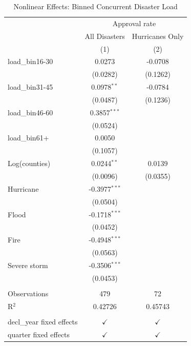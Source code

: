 
\begin{table}[htbp]
   \caption{\label{tab:binned} Nonlinear Effects: Binned Concurrent Disaster Load}
   \bigskip
   \centering
   \begin{tabular}{lcc}
      \toprule
       & \multicolumn{2}{c}{Approval rate}\\
                                & All Disasters   & Hurricanes Only \\   
                                & (1)             & (2)\\  
      \midrule 
      load\_bin16-30            & 0.0273          & -0.0708\\   
                                & (0.0282)        & (0.1262)\\   
      load\_bin31-45            & 0.0978$^{**}$   & -0.0784\\   
                                & (0.0487)        & (0.1236)\\   
      load\_bin46-60            & 0.3857$^{***}$  &   \\   
                                & (0.0524)        &   \\   
      load\_bin61+              & 0.0050          &   \\   
                                & (0.1057)        &   \\   
      Log(counties)             & 0.0244$^{**}$   & 0.0139\\   
                                & (0.0096)        & (0.0355)\\   
      Hurricane                 & -0.3977$^{***}$ &   \\   
                                & (0.0504)        &   \\   
      Flood                     & -0.1718$^{***}$ &   \\   
                                & (0.0452)        &   \\   
      Fire                      & -0.4948$^{***}$ &   \\   
                                & (0.0563)        &   \\   
      Severe storm              & -0.3506$^{***}$ &   \\   
                                & (0.0453)        &   \\   
       \\
      Observations              & 479             & 72\\  
      R$^2$                     & 0.42726         & 0.45743\\  
       \\
      decl\_year fixed effects  & $\checkmark$    & $\checkmark$\\   
      quarter fixed effects     & $\checkmark$    & $\checkmark$\\   
      \bottomrule
   \end{tabular}
   

\end{table}
